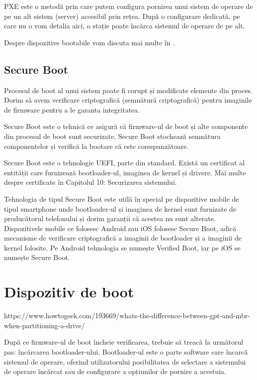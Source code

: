 PXE este o metodă prin care putem configura pornirea unui sistem de operare de
pe un alt sistem (server) accesibil prin rețea. După o configurare dedicată, pe
care nu o vom detalia aici, o stație poate încărca sistemul de operare de pe
alt.

Despre dispozitive bootabile vom discuta mai multe în
.

\subsection{Secure Boot}
\label{sec:boot-firmware-secureboot}

Procesul de boot al unui sistem poate fi corupt și modificate elemente din
proces. Dorim să avem verificare criptografică (semnătură criptografică) pentru
imaginile de firmware pentru a le garanta integritatea.

Secure Boot este o tehnică ce asigură că firmware-ul de boot și alte componente
din procesul de boot sunt securizate. Secure Boot stochează semnătura
componentelor și verifică la bootare că este corespunzătoare.

Secure Boot este o tehnologie UEFI, parte din standard. Există un certificat al
entității care furnizează bootloader-ul, imaginea de kernel și drivere. Mai
multe despre certificate în Capitolul 10: Securizarea sistemului.

Tehnologia de tipul Secure Boot este utilă în special pe dispozitive mobile de
tipul smartphone unde bootloader-ul și imaginea de kernel sunt furnizate de
producătorul telefonului și dorim garanții că acestea nu sunt alterate.
Dispozitivele mobile ce folosesc Android sau iOS folosesc Secure Boot, adică
mecanisme de verificare criptografică a imaginii de bootloader și a imaginii de
kernel folosite. Pe Android tehnologia se numește  Verified Boot, iar pe iOS se
numește Secure Boot.

\section{Dispozitiv de boot}
\label{sec:boot-bootdev}

https://www.howtogeek.com/193669/whats-the-difference-between-gpt-and-mbr-when-partitioning-a-drive/

După ce firmware-ul de boot încheie verificarea, trebuie să treacă la următorul
pas: încărcarea bootloader-ului. Bootloader-ul este o parte software care
încarcă sistemul de operare, oferind utilizatorului posibilitatea de selectare a
sistemului de operare încărcat sau de configurare a opțiunilor de pornire a
acestuia.

